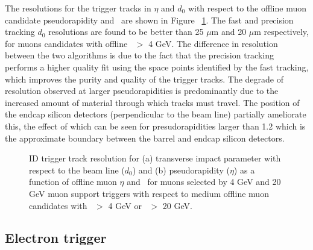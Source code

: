 	The resolutions for the trigger tracks in $\eta$ and $d_0$ with respect to the offline muon candidate pseudorapidity and \pt\ are shown in Figure ~\ref{fig:muon_idtrig_res}. The fast and precision tracking $d_0$ resolutions are found to be better than 25 $\mu$m and 20 $\mu$m respectively, for muons candidates with offline \pt\ $>$ 4 GeV. The difference in resolution between the two algorithms is due to the fact that the precision tracking performs a higher quality fit using the space points identified by the fast tracking, which improves the purity and quality of the trigger tracks. The degrade of resolution observed at larger pseudorapidities is predominantly due to the increased amount of material through which tracks must travel. The position of the endcap silicon detectors (perpendicular to the beam line) partially ameliorate this, the effect of which can be seen for presudorapidities larger than 1.2 which is the approximate boundary between the barrel and endcap silicon detectors.
		\begin{figure}[!htb]
	\begin{center}
		\hspace{0.05\textwidth}
			\hspace{0.05\textwidth}
	\end{center}	
	\caption{\ac{ID} trigger track resolution for (a) transverse impact parameter with respect to the beam line ($d_0$) and (b) pseudorapidity ($\eta$) as a function of offline muon $\eta$ and \pt\ for muons selected by 4 GeV and 20 GeV muon support triggers with respect to medium offline muon candidates with \pt\ $>$ 4 GeV or \pt\ $>$ 20 GeV.}
	\label{fig:muon_idtrig_res}
	\end{figure}	
	
		\subsection*{Electron trigger}
		
